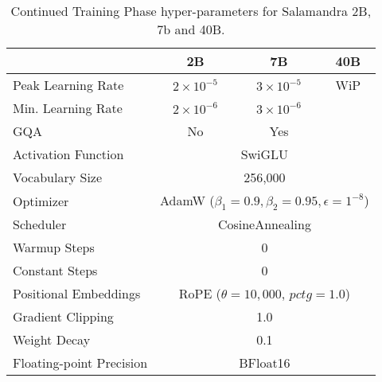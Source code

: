 \begin{table}[h!]
	\centering
	\begin{tabular}{l|ccc}
	\toprule
    & \textbf{2B}  & \textbf{7B}  & \textbf{40B}\\
	\midrule
	Peak Learning Rate & $2 \times 10^{-5}$ & $3  \times 10^{-5}$ & WiP \\
    Min. Learning Rate & $2 \times 10^{-6}$ & $3  \times 10^{-6}$ &  \\
    GQA & No & Yes &  \\
	Activation Function   & \multicolumn{3}{c}{SwiGLU} \\
	Vocabulary Size       & \multicolumn{3}{c}{256,000} \\
    Optimizer & \multicolumn{3}{c}{AdamW ($\beta_1=0.9, \beta_2=0.95, \epsilon=1^{-8}$)} \\
    Scheduler & \multicolumn{3}{c}{CosineAnnealing} \\
    Warmup Steps & \multicolumn{3}{c}{0} \\
    Constant Steps & \multicolumn{3}{c}{0} \\
	Positional Embeddings & \multicolumn{3}{c}{RoPE ($\theta=10,000$, $pctg=1.0$)} \\
    Gradient Clipping & \multicolumn{3}{c}{1.0} \\
    Weight Decay & \multicolumn{3}{c}{0.1} \\
    Floating-point Precision & \multicolumn{3}{c}{BFloat16} \\
	\bottomrule
	\end{tabular}
	\caption{Continued Training Phase hyper-parameters for Salamandra 2B, 7b and 40B.}
	\label{tab:continued_training}
\end{table}